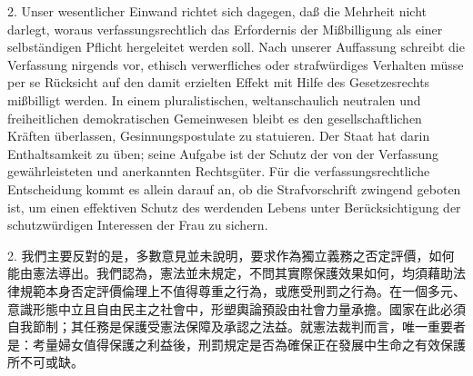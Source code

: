\documentclass[12pt]{article}
\begin{document}
\syncleft
\begin{sourcepara}
2. Unser wesentlicher Einwand richtet sich dagegen, daß die Mehrheit nicht darlegt, woraus verfassungsrechtlich das Erfordernis der Mißbilligung als einer selbständigen Pflicht hergeleitet werden soll. Nach unserer Auffassung schreibt die Verfassung nirgends vor, ethisch verwerfliches oder strafwürdiges Verhalten müsse per se Rücksicht auf den damit erzielten Effekt mit Hilfe des Gesetzesrechts mißbilligt werden. In einem pluralistischen, weltanschaulich neutralen und freiheitlichen demokratischen Gemeinwesen bleibt es den gesellschaftlichen Kräften überlassen, Gesinnungspostulate zu statuieren. Der Staat hat darin Enthaltsamkeit zu üben; seine Aufgabe ist der Schutz der von der Verfassung gewährleisteten und anerkannten Rechtsgüter. Für die verfassungsrechtliche Entscheidung kommt es allein darauf an, ob die Strafvorschrift zwingend geboten ist, um einen effektiven Schutz des werdenden Lebens unter Berücksichtigung der schutzwürdigen Interessen der Frau zu sichern.
\end{sourcepara}
\begin{transpara}
2. 我們主要反對的是，多數意見並未說明，要求作為獨立義務之否定評價，如何能由憲法導出。我們認為，憲法並未規定，不問其實際保護效果如何，均須藉助法律規範本身否定評價倫理上不值得尊重之行為，或應受刑罰之行為。在一個多元、意識形態中立且自由民主之社會中，形塑輿論預設由社會力量承擔。國家在此必須自我節制；其任務是保護受憲法保障及承認之法益。就憲法裁判而言，唯一重要者是：考量婦女值得保護之利益後，刑罰規定是否為確保正在發展中生命之有效保護所不可或缺。
\end{transpara}
\end{document}
